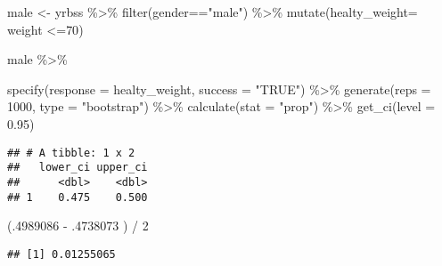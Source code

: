\documentclass[
]{article}
\newenvironment{Shaded}{\begin{snugshade}}{\end{snugshade}}
\newcommand{\AttributeTok}[1]{\textcolor[rgb]{0.77,0.63,0.00}{#1}}
\newcommand{\DecValTok}[1]{\textcolor[rgb]{0.00,0.00,0.81}{#1}}
\newcommand{\FloatTok}[1]{\textcolor[rgb]{0.00,0.00,0.81}{#1}}
\newcommand{\FunctionTok}[1]{\textcolor[rgb]{0.00,0.00,0.00}{#1}}
\newcommand{\NormalTok}[1]{#1}
\newcommand{\OtherTok}[1]{\textcolor[rgb]{0.56,0.35,0.01}{#1}}
\newcommand{\SpecialCharTok}[1]{\textcolor[rgb]{0.00,0.00,0.00}{#1}}
\newcommand{\StringTok}[1]{\textcolor[rgb]{0.31,0.60,0.02}{#1}}
\begin{document}
\begin{Shaded}
\begin{Highlighting}[]
\NormalTok{male }\OtherTok{\textless{}{-}}\NormalTok{ yrbss }\SpecialCharTok{\%\textgreater{}\%}
  \FunctionTok{filter}\NormalTok{(gender}\SpecialCharTok{==}\StringTok{"male"}\NormalTok{) }\SpecialCharTok{\%\textgreater{}\%} 
  \FunctionTok{mutate}\NormalTok{(}\AttributeTok{healty\_weight=}\NormalTok{ weight }\SpecialCharTok{\textless{}=}\DecValTok{70}\NormalTok{)}
  
\NormalTok{male }\SpecialCharTok{\%\textgreater{}\%}
  
\FunctionTok{specify}\NormalTok{(}\AttributeTok{response =}\NormalTok{ healty\_weight, }\AttributeTok{success =} \StringTok{"TRUE"}\NormalTok{) }\SpecialCharTok{\%\textgreater{}\%}
  \FunctionTok{generate}\NormalTok{(}\AttributeTok{reps =} \DecValTok{1000}\NormalTok{, }\AttributeTok{type =} \StringTok{"bootstrap"}\NormalTok{) }\SpecialCharTok{\%\textgreater{}\%}
  \FunctionTok{calculate}\NormalTok{(}\AttributeTok{stat =} \StringTok{"prop"}\NormalTok{) }\SpecialCharTok{\%\textgreater{}\%}
  \FunctionTok{get\_ci}\NormalTok{(}\AttributeTok{level =} \FloatTok{0.95}\NormalTok{)}
\end{Highlighting}
\end{Shaded}

\begin{verbatim}
## # A tibble: 1 x 2
##   lower_ci upper_ci
##      <dbl>    <dbl>
## 1    0.475    0.500
\end{verbatim}

\begin{Shaded}
\begin{Highlighting}[]
\NormalTok{(.}\DecValTok{4989086} \SpecialCharTok{{-}}\NormalTok{ .}\DecValTok{4738073}\NormalTok{    ) }\SpecialCharTok{/} \DecValTok{2}
\end{Highlighting}
\end{Shaded}

\begin{verbatim}
## [1] 0.01255065
\end{verbatim}
\end{document}

